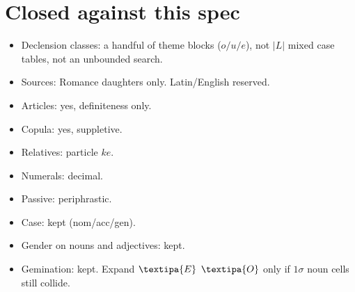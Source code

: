 \documentclass[12pt]{book}
\begin{document}
\chapter{Closed against this spec}

\begin{itemize}
  \item Declension classes: a handful of theme blocks ($o/u/e$), not
        $|L|$ mixed case tables, not an unbounded search.
  \item Sources: Romance daughters only. Latin/English reserved.
  \item Articles: yes, definiteness only.
  \item Copula: yes, suppletive.
  \item Relatives: particle $ke$.
  \item Numerals: decimal.
  \item Passive: periphrastic.
  \item Case: kept (nom/acc/gen).
  \item Gender on nouns and adjectives: kept.
  \item Gemination: kept. Expand $\textipa{E}$ $\textipa{O}$ only if
        $1\sigma$ noun cells still collide.
\end{itemize}
\end{document}
